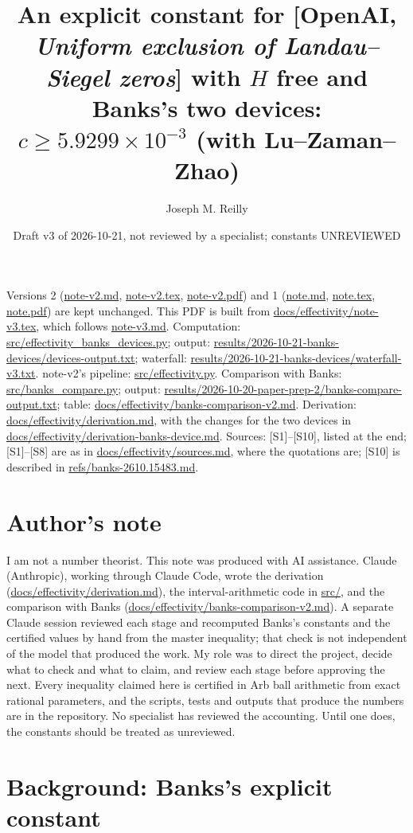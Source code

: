 \documentclass[11pt]{article}
\title{An explicit constant for [OpenAI, \emph{Uniform exclusion of Landau--Siegel zeros}] with $H$ free and Banks's two devices: $c \ge 5.9299\times 10^{-3}$ (with Lu--Zaman--Zhao)}
\author{Joseph M. Reilly}
\date{Draft v3 of 2026-10-21, not reviewed by a specialist; constants UNREVIEWED}
\begin{document}
\maketitle

\noindent Versions 2 (\url{note-v2.md}, \url{note-v2.tex}, \url{note-v2.pdf}) and 1 (\url{note.md}, \url{note.tex}, \url{note.pdf}) are kept unchanged. This PDF is built from \url{docs/effectivity/note-v3.tex}, which follows \url{note-v3.md}.
Computation: \url{src/effectivity_banks_devices.py}; output: \url{results/2026-10-21-banks-devices/devices-output.txt}; waterfall: \url{results/2026-10-21-banks-devices/waterfall-v3.txt}. note-v2's pipeline: \url{src/effectivity.py}.
Comparison with Banks: \url{src/banks_compare.py}; output: \url{results/2026-10-20-paper-prep-2/banks-compare-output.txt}; table: \url{docs/effectivity/banks-comparison-v2.md}.
Derivation: \url{docs/effectivity/derivation.md}, with the changes for the two devices in \url{docs/effectivity/derivation-banks-device.md}. Sources: [S1]--[S10], listed at the end; [S1]--[S8] are as in \url{docs/effectivity/sources.md}, where the quotations are; [S10] is described in \url{refs/banks-2610.15483.md}.

\section*{Author's note}
I am not a number theorist. This note was produced with AI assistance. Claude (Anthropic), working through Claude Code, wrote the derivation (\url{docs/effectivity/derivation.md}), the interval-arithmetic code in \url{src/}, and the comparison with Banks (\url{docs/effectivity/banks-comparison-v2.md}). A separate Claude session reviewed each stage and recomputed Banks's constants and the certified values by hand from the master inequality; that check is not independent of the model that produced the work. My role was to direct the project, decide what to check and what to claim, and review each stage before approving the next. Every inequality claimed here is certified in Arb ball arithmetic from exact rational parameters, and the scripts, tests and outputs that produce the numbers are in the repository. No specialist has reviewed the accounting. Until one does, the constants should be treated as unreviewed.

\section{Background: Banks's explicit constant}
\end{document}
